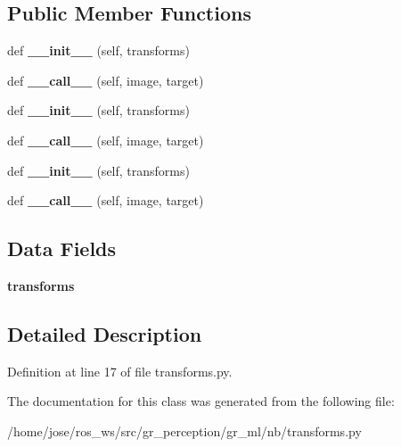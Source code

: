 \subsection*{Public Member Functions}
\begin{DoxyCompactItemize}
\item 
\mbox{\label{classtransforms_1_1Compose_a585c4a33a7347a32ef289182242997d3}} 
def {\bfseries \+\_\+\+\_\+init\+\_\+\+\_\+} (self, transforms)
\item 
\mbox{\label{classtransforms_1_1Compose_a31de428c31e985932ae3a57fb876aa28}} 
def {\bfseries \+\_\+\+\_\+call\+\_\+\+\_\+} (self, image, target)
\item 
\mbox{\label{classtransforms_1_1Compose_a585c4a33a7347a32ef289182242997d3}} 
def {\bfseries \+\_\+\+\_\+init\+\_\+\+\_\+} (self, transforms)
\item 
\mbox{\label{classtransforms_1_1Compose_a31de428c31e985932ae3a57fb876aa28}} 
def {\bfseries \+\_\+\+\_\+call\+\_\+\+\_\+} (self, image, target)
\item 
\mbox{\label{classtransforms_1_1Compose_a585c4a33a7347a32ef289182242997d3}} 
def {\bfseries \+\_\+\+\_\+init\+\_\+\+\_\+} (self, transforms)
\item 
\mbox{\label{classtransforms_1_1Compose_a31de428c31e985932ae3a57fb876aa28}} 
def {\bfseries \+\_\+\+\_\+call\+\_\+\+\_\+} (self, image, target)
\end{DoxyCompactItemize}
\subsection*{Data Fields}
\begin{DoxyCompactItemize}
\item 
\mbox{\label{classtransforms_1_1Compose_a9785288a581cdfe793c0aa106fcc75b1}} 
{\bfseries transforms}
\end{DoxyCompactItemize}


\subsection{Detailed Description}


Definition at line 17 of file transforms.\+py.



The documentation for this class was generated from the following file\+:\begin{DoxyCompactItemize}
\item 
/home/jose/ros\+\_\+ws/src/gr\+\_\+perception/gr\+\_\+ml/nb/transforms.\+py\end{DoxyCompactItemize}
